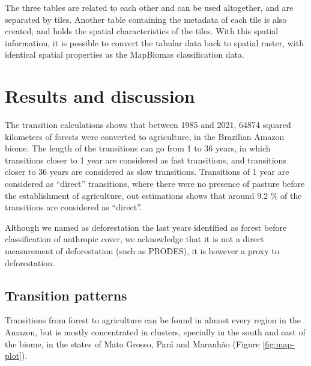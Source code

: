 \documentclass[essd, manuscript]{copernicus}
\begin{document}
The three tables are related to each other and can be used altogether, and are separated by tiles.
Another table containing the metadata of each tile is also created, and holds the spatial characteristics of the tiles.
With this spatial information, it is possible to convert the tabular data back to spatial raster, with identical spatial properties as the MapBiomas classification data.

\section{Results and discussion}

The transition calculations shows that between 1985 and 2021, 64874 squared kilometers of forests were converted to agriculture, in the Brazilian Amazon biome.
The length of the transitions can go from 1 to 36 years, in which transitions closer to 1 year are considered as fast transitions, and transitions closer to 36 years are considered as slow transitions.
Transitions of 1 year are considered as ``direct'' transitions, where there were no presence of pasture before the establishment of agriculture, out estimations shows that around 9.2 \% of the transitions are considered as ``direct''.

Although we named as deforestation the last years identified as forest before classification of anthropic cover, we acknowledge that it is not a direct measurement of deforestation (such as PRODES), it is however a proxy to deforestation.

\subsection{Transition patterns}

Transitions from forest to agriculture can be found in almost every region in the Amazon, but is mostly concentrated in clusters, specially in the south and east of the biome, in the states of Mato Grosso, Pará and Maranhão (Figure \ref{fig:map-plot}).
\end{document}
